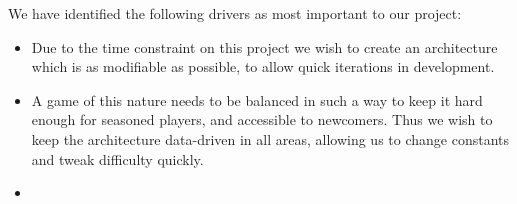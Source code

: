 We have identified the following drivers as most important to our project:
\begin{itemize}
	\item Due to the time constraint on this project we wish to create an 	
	architecture which is as modifiable as possible, to allow quick iterations
	in development.
	\item A game of this nature needs to be balanced in such a way to keep it
	hard enough for seasoned players, and accessible to newcomers.  Thus we 
	wish to keep the architecture data-driven in all areas, allowing us to
	change constants and tweak difficulty quickly.
	\item 
\end{itemize}